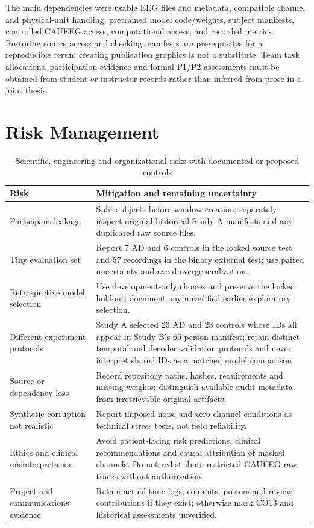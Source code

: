 The main dependencies were usable EEG files and metadata, compatible channel and physical-unit handling, pretrained model code/weights, subject manifests, controlled CAUEEG access, computational access, and recorded metrics. Restoring source access and checking manifests are prerequisites for a reproducible rerun; creating publication graphics is not a substitute. Team task allocations, participation evidence and formal P1/P2 assessments must be obtained from student or instructor records rather than inferred from prose in a joint thesis.

\section{Risk Management}
\begin{table}[H]\centering\small
\caption{Scientific, engineering and organizational risks with documented or proposed controls}\label{tab:risks}
\begin{tabularx}{\textwidth}{@{}>{\RaggedRight\arraybackslash}p{}>{\RaggedRight\arraybackslash}X@{}}\toprule
\textbf{Risk}&\textbf{Mitigation and remaining uncertainty}\\\midrule
Participant leakage&Split subjects before window creation; separately inspect original historical Study A manifests and any duplicated raw source files.\\
Tiny evaluation set&Report 7 AD and 6 controls in the locked source test and 57 recordings in the binary external test; use paired uncertainty and avoid overgeneralization.\\
Retrospective model selection&Use development-only choices and preserve the locked holdout; document any unverified earlier exploratory selection.\\
Different experiment protocols&Study A selected 23 AD and 23 controls whose IDs all appear in Study B's 65-person manifest; retain distinct temporal and decoder validation protocols and never interpret shared IDs as a matched model comparison.\\
Source or dependency loss&Record repository paths, hashes, requirements and missing weights; distinguish available audit metadata from irretrievable original artifacts.\\
Synthetic corruption not realistic&Report imposed noise and zero-channel conditions as technical stress tests, not field reliability.\\
Ethics and clinical misinterpretation&Avoid patient-facing risk predictions, clinical recommendations and causal attribution of masked channels. Do not redistribute restricted CAUEEG raw traces without authorization.\\
Project and communications evidence&Retain actual time logs, commits, posters and review contributions if they exist; otherwise mark CO13 and historical assessments unverified.\\
\bottomrule\end{tabularx}\end{table}

